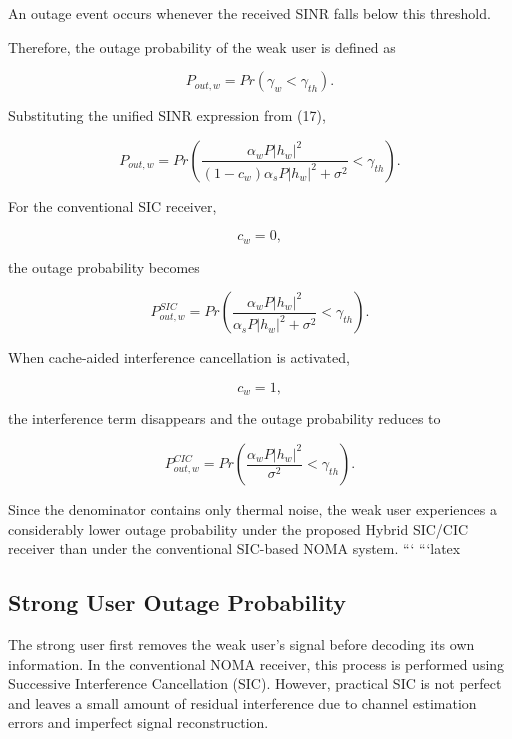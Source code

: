 \documentclass[conference]{IEEEtran}
\begin{document}
An outage event occurs whenever the received SINR falls below this threshold.

Therefore, the outage probability of the weak user is defined as

\begin{equation}
P_{out,w}
=
Pr
\left(
\gamma_w
<
\gamma_{th}
\right).
\end{equation}

Substituting the unified SINR expression from (17),

\begin{equation}
P_{out,w}
=
Pr
\left(
\frac{\alpha_wP|h_w|^2}
{(1-c_w)\alpha_sP|h_w|^2+\sigma^2}
<
\gamma_{th}
\right).
\end{equation}

For the conventional SIC receiver,

\[
c_w=0,
\]

the outage probability becomes

\begin{equation}
P_{out,w}^{SIC}
=
Pr
\left(
\frac{\alpha_wP|h_w|^2}
{\alpha_sP|h_w|^2+\sigma^2}
<
\gamma_{th}
\right).
\end{equation}

When cache-aided interference cancellation is activated,

\[
c_w=1,
\]

the interference term disappears and the outage probability reduces to

\begin{equation}
P_{out,w}^{CIC}
=
Pr
\left(
\frac{\alpha_wP|h_w|^2}
{\sigma^2}
<
\gamma_{th}
\right).
\end{equation}

Since the denominator contains only thermal noise, the weak user experiences a considerably lower outage probability under the proposed Hybrid SIC/CIC receiver than under the conventional SIC-based NOMA system.
```
```latex
\subsection{Strong User Outage Probability}

The strong user first removes the weak user's signal before decoding its own information. In the conventional NOMA receiver, this process is performed using Successive Interference Cancellation (SIC). However, practical SIC is not perfect and leaves a small amount of residual interference due to channel estimation errors and imperfect signal reconstruction.
\end{document}
